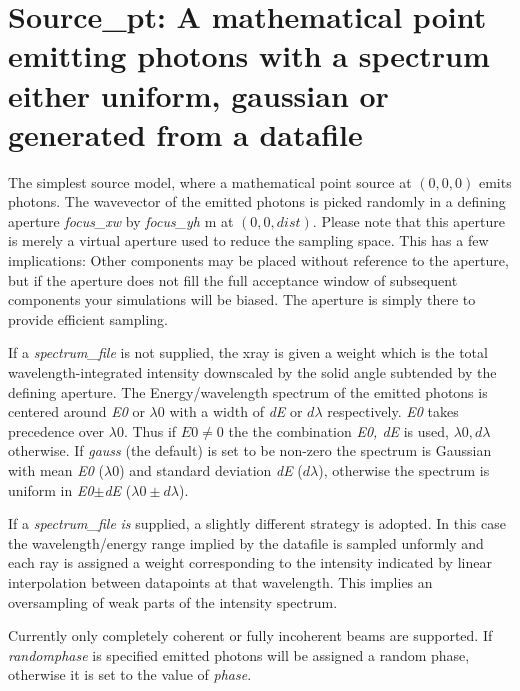 \section{Source\_pt: A mathematical point emitting photons with a spectrum either uniform, gaussian or generated from a datafile}
\label{s:source-pt}

The simplest source model, where a mathematical point source at $(0,0,0)$ emits photons. The wavevector of the emitted photons
is picked randomly in a defining aperture \emph{focus\_xw} by \emph{focus\_yh} m at $(0,0,\mathit{dist})$. 
Please note that this aperture is merely a
virtual aperture used to reduce the sampling space. This has a few
implications: Other components may be placed without reference to the aperture,
but if the aperture does not fill the full acceptance window of subsequent
components your simulations will be biased. The aperture is simply there to provide efficient sampling.

If a \textit{spectrum\_file} is not supplied, the xray
is given a weight which is the total wavelength-integrated intensity downscaled
by the solid angle subtended by the defining aperture.
The Energy/wavelength spectrum of the emitted photons is centered around \textit{E0} or  $\lambda 0$ with a width of \textit{dE} or $d\lambda$ respectively. 
\textit{E0} takes precedence over $\lambda0$. Thus if $E0\neq0$ the the combination \textit{E0, dE} is used, $\lambda0,d\lambda$ otherwise.
If \textit{gauss} (the default) is set to be non-zero the spectrum is Gaussian with mean \textit{E0} ($\lambda 0$) and standard deviation \textit{dE} ($d\lambda$), otherwise the
spectrum is uniform in \textit{E0}$\pm$\textit{dE} ($\lambda 0\pm d\lambda$).

If a \textit{spectrum\_file} \emph{is} supplied, a slightly different strategy is adopted. In this case the
wavelength/energy range implied by the datafile is sampled unformly and each ray is assigned
a weight corresponding to the intensity indicated by linear interpolation between datapoints
at that wavelength. This implies an oversampling of weak parts of the intensity spectrum.

Currently only completely coherent or fully incoherent beams are supported. If
\textit{randomphase} is specified emitted photons will be assigned a random phase, otherwise it is
set to the value of \textit {phase}.


